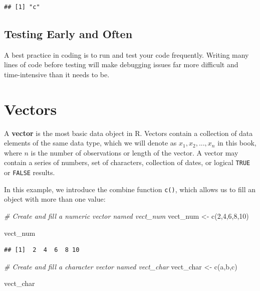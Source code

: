 \documentclass[
]{book}
\newenvironment{Shaded}{\begin{snugshade}}{\end{snugshade}}
\newcommand{\CommentTok}[1]{\textcolor[rgb]{0.56,0.35,0.01}{\textit{#1}}}
\newcommand{\DecValTok}[1]{\textcolor[rgb]{0.00,0.00,0.81}{#1}}
\newcommand{\FunctionTok}[1]{\textcolor[rgb]{0.00,0.00,0.00}{#1}}
\newcommand{\NormalTok}[1]{#1}
\newcommand{\OtherTok}[1]{\textcolor[rgb]{0.56,0.35,0.01}{#1}}
\newcommand{\StringTok}[1]{\textcolor[rgb]{0.31,0.60,0.02}{#1}}
\begin{document}
\begin{verbatim}
## [1] "c"
\end{verbatim}

\hypertarget{testing-early-and-often}{%
\subsection{Testing Early and Often}\label{testing-early-and-often}}

A best practice in coding is to run and test your code frequently. Writing many lines of code before testing will make debugging issues far more difficult and time-intensive than it needs to be.

\hypertarget{vectors}{%
\section{Vectors}\label{vectors}}

A \textbf{vector} is the most basic data object in R. Vectors contain a collection of data elements of the same data type, which we will denote as \(x_1, x_2, ..., x_n\) in this book, where \(n\) is the number of observations or length of the vector. A vector may contain a series of numbers, set of characters, collection of dates, or logical \texttt{TRUE} or \texttt{FALSE} results.

In this example, we introduce the combine function \texttt{c()}, which allows us to fill an object with more than one value:

\begin{Shaded}
\begin{Highlighting}[]
\CommentTok{\# Create and fill a numeric vector named vect\_num}
\NormalTok{vect\_num }\OtherTok{\textless{}{-}} \FunctionTok{c}\NormalTok{(}\DecValTok{2}\NormalTok{,}\DecValTok{4}\NormalTok{,}\DecValTok{6}\NormalTok{,}\DecValTok{8}\NormalTok{,}\DecValTok{10}\NormalTok{)}

\NormalTok{vect\_num}
\end{Highlighting}
\end{Shaded}

\begin{verbatim}
## [1]  2  4  6  8 10
\end{verbatim}

\begin{Shaded}
\begin{Highlighting}[]
\CommentTok{\# Create and fill a character vector named vect\_char}
\NormalTok{vect\_char }\OtherTok{\textless{}{-}} \FunctionTok{c}\NormalTok{(}\StringTok{\textquotesingle{}a\textquotesingle{}}\NormalTok{,}\StringTok{\textquotesingle{}b\textquotesingle{}}\NormalTok{,}\StringTok{\textquotesingle{}c\textquotesingle{}}\NormalTok{)}

\NormalTok{vect\_char}
\end{Highlighting}
\end{Shaded}
\end{document}
